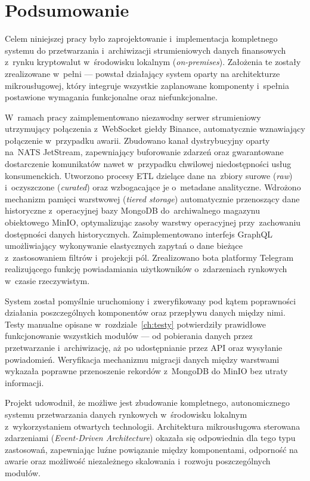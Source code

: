 \chapter{Podsumowanie}
\label{ch:podsumowanie}

Celem niniejszej pracy było zaprojektowanie i~implementacja kompletnego systemu do przetwarzania i~archiwizacji
strumieniowych danych finansowych z~rynku kryptowalut w~środowisku lokalnym (\textit{on-premises}).
Założenia te zostały zrealizowane w~pełni --- powstał działający system oparty na architekturze mikrousługowej,
który integruje wszystkie zaplanowane komponenty i~spełnia postawione wymagania funkcjonalne oraz niefunkcjonalne.

W~ramach pracy zaimplementowano niezawodny serwer strumieniowy utrzymujący połączenia z~WebSocket giełdy Binance,
automatycznie wznawiający połączenie w~przypadku awarii.
Zbudowano kanał dystrybucyjny oparty na~NATS JetStream, zapewniający buforowanie zdarzeń oraz gwarantowane
dostarczenie komunikatów nawet w~przypadku chwilowej niedostępności usług konsumenckich.
Utworzono procesy ETL dzielące dane na~zbiory surowe (\textit{raw}) i~oczyszczone (\textit{curated}) oraz wzbogacające
je o~metadane analityczne.
Wdrożono mechanizm pamięci warstwowej (\textit{tiered storage}) automatycznie przenoszący dane historyczne
z~operacyjnej bazy MongoDB do~archiwalnego magazynu obiektowego MinIO, optymalizując zasoby warstwy operacyjnej
przy~zachowaniu dostępności danych historycznych.
Zaimplementowano interfejs GraphQL umożliwiający wykonywanie elastycznych zapytań o dane bieżące z~zastosowaniem filtrów
i~projekcji pól.
Zrealizowano bota platformy Telegram realizującego funkcję powiadamiania użytkowników o~zdarzeniach rynkowych
w~czasie rzeczywistym.

System został pomyślnie uruchomiony i~zweryfikowany pod kątem poprawności działania poszczególnych komponentów oraz
przepływu danych między nimi.
Testy manualne opisane w~rozdziale~\ref{ch:testy} potwierdziły prawidłowe funkcjonowanie wszystkich modułów --- od
pobierania danych przez przetwarzanie i~archiwizację, aż po udostępnianie przez API oraz wysyłanie powiadomień.
Weryfikacja mechanizmu migracji danych między warstwami wykazała poprawne przenoszenie rekordów z~MongoDB do MinIO
bez utraty informacji.

Projekt udowodnił, że możliwe jest zbudowanie kompletnego, autonomicznego systemu przetwarzania danych rynkowych
w~środowisku lokalnym z~wykorzystaniem otwartych technologii.
Architektura mikrousługowa sterowana zdarzeniami (\textit{Event-Driven Architecture}) okazała się odpowiednia dla
tego typu zastosowań, zapewniając luźne powiązanie między komponentami, odporność na awarie oraz możliwość
niezależnego skalowania i~rozwoju poszczególnych modułów.

